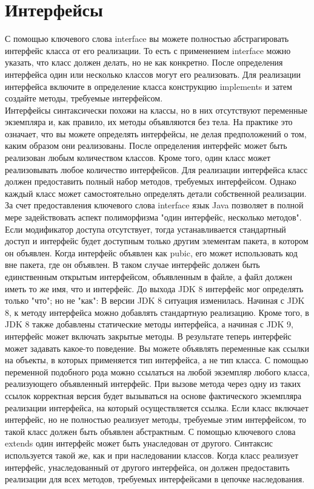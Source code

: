 \section{Интерфейсы}
С помощью ключевого слова interface вы можете полностью абстрагировать интерфейс класса от его реализации. То есть с применением interface можно указать, что класс должен делать, но не как конкретно. После определения интерфейса один или несколько классов могут его реализовать. Для реализации интерфейса включите в определение класса конструкцию implements и затем создайте методы, требуемые интерфейсом. \\
Интерфейсы синтаксически похожи на классы, но в них отсутствуют переменные экземпляра и, как правило, их методы объявляются без тела. На практике это означает, что вы можете определять интерфейсы, не делая предположений о том, каким образом они реализованы. После определения интерфейс может быть реализован любым количеством классов. Кроме того, один класс может реализовывать любое количество интерфейсов. Для реализации интерфейса класс должен предоставить полный набор методов, требуемых интерфейсом. Однако каждый класс может самостоятельно определять детали собственной реализации. За счет предоставления ключевого слова interface язык Java позволяет в полной мере задействовать аспект полиморфизма "один интерфейс, несколько методов". Если модификатор доступа отсутствует, тогда устанавливается стандартный доступ и интерфейс будет доступным только другим элементам пакета, в котором он объявлен. Когда интерфейс объявлен как pubic, его может использовать код вне пакета, где он объявлен. В таком случае интерфейс должен быть единственным открытым интерфейсом, объявленным в файле, а файл должен иметь то же имя, что и интерфейс. До выхода JDK 8 интерфейс мог определять только "что"; но не "как": В версии JDK 8 ситуация изменилась. Начиная с JDK 8, к методу интерфейса можно добавлять стандартную реализацию. Кроме того, в JDK 8 также добавлены статические методы интерфейса, а начиная с JDK 9, интерфейс может включать закрытые методы. В результате теперь интерфейс может задавать какое-то поведение. Вы можете объявлять переменные как ссылки на объекты, в которых применяется тип интерфейса, а не тип класса. С помощью переменной подобного рода можно ссылаться на любой экземпляр любого класса, реализующего объявленный интерфейс. При вызове метода через одну из таких ссылок корректная версия будет вызываться на основе фактического экземпляра реализации интерфейса, на который осуществляется ссылка. Если класс включает интерфейс, но не полностью реализует методы, требуемые этим интерфейсом, то такой класс должен быть объявлен абстрактным. С помощью ключевого слова extends один интерфейс может быть унаследован от другого. Синтаксис используется такой же, как и при наследовании классов. Когда класс реализует интерфейс, унаследованный от другого интерфейса, он должен предоставить реализации для всех методов, требуемых интерфейсами в цепочке наследования. \\

